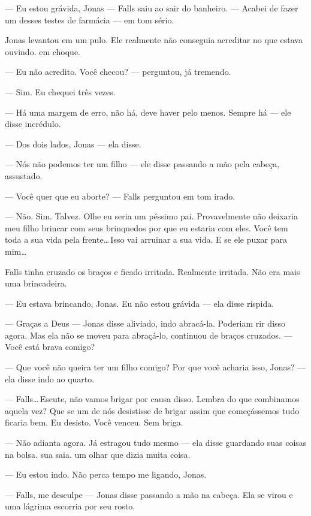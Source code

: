--- Eu estou grávida, Jonas --- Falls saiu ao sair do banheiro. --- Acabei de fazer um desses testes de farmácia --- em tom sério.

Jonas levantou em um pulo. Ele realmente não conseguia acreditar no que estava ouvindo.  em choque.

--- Eu não acredito. Você checou? --- perguntou, já tremendo.

--- Sim. Eu chequei três vezes.

--- Há uma margem de erro, não há, deve haver\mudanca{,} pelo menos. Sempre há --- ele disse\mudanca{,} incrédulo.

--- Dos dois lados, Jonas --- ela disse.

--- Nós não podemos ter um filho --- ele disse\mudanca{,} passando a mão pela cabeça, assustado.

--- Você quer que eu aborte? --- Falls perguntou em tom irado.

--- Não. Sim. Talvez. Olhe\mudanca{,} eu seria um péssimo pai. Provavelmente não deixaria meu filho brincar com seus brinquedos\mudanca{,} por que eu estaria com eles. Você tem toda a sua vida pela frente\ldots\,Isso vai arruinar a sua vida. E se ele puxar para mim\ldots

Falls tinha cruzado os braços e ficado irritada. Realmente irritada. Não era mais uma brincadeira.

--- Eu estava brincando, Jonas. Eu não estou grávida --- ela disse\mudanca{,} ríspida.

--- Graças a Deus --- Jonas disse\mudanca{,} aliviado, indo abracá-la. Poderiam rir disso agora. Mas ela não se moveu para abraçá-lo, continuou de braços cruzados. --- Você está brava comigo?

--- Que você não queira ter um filho comigo? Por que você acharia isso, Jonas? --- ela disse\mudanca{,} indo ao quarto.

--- Falls\ldots\,Escute, não vamos brigar por causa disso. Lembra do que combinamos aquela vez? Que se um de nós desistisse de brigar assim que começássemos\mudanca{,} tudo ficaria bem. Eu desisto. Você venceu. Sem briga.

--- Não adianta agora. Já estragou tudo mesmo --- ela disse\mudanca{,} guardando suas coisas na bolsa.  sua saia.  um olhar que dizia muita coisa.

--- Eu estou indo. Não perca tempo me ligando, Jonas.

--- Falls, me desculpe --- Jonas disse\mudanca{,} passando a mão na cabeça. Ela se virou e uma lágrima escorria por seu rosto.

